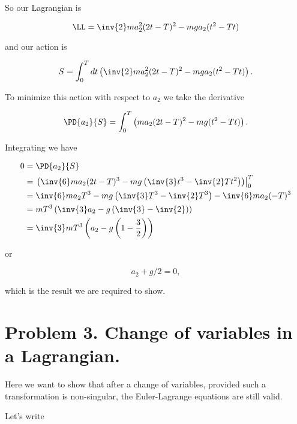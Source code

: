 So our Lagrangian is 

\begin{equation}\label{eqn:classicalMechanicsPs1:240}
\LL = 
\inv{2} m a_2^2 (2 t - T )^2 - m g a_2 (t^2 - T t)
\end{equation}

and our action is

\begin{equation}\label{eqn:classicalMechanicsPs1:260}
S = \int_0^T dt 
\left( 
\inv{2} m a_2^2 (2 t - T )^2 - m g a_2 (t^2 - T t)
\right).
\end{equation}

To minimize this action with respect to $a_2$ we take the derivative

\begin{equation}\label{eqn:classicalMechanicsPs1:280}
\PD{a_2}{S} = \int_0^T
\left( 
m a_2 (2 t - T )^2 - m g (t^2 - T t)
\right).
\end{equation}

Integrating we have

\begin{align*}
0 &= \PD{a_2}{S} \\
&={\left.
\left(
\inv{6} m a_2 (2 t - T )^3 - m g \left(\inv{3}t^3 - \inv{2}T t^2 \right)
\right)\right\vert}_0^T \\
&=
\inv{6} m a_2 T^3 - m g \left(\inv{3}T^3 - \inv{2}T^3 \right)
-
\inv{6} m a_2 (- T )^3 \\
&=
m T^3 \left( \inv{3} a_2 - g \left( \inv{3} - \inv{2} \right) \right) \\
&=
\inv{3} m T^3 \left( a_2 - g \left( 1 - \frac{3}{2} \right) \right) \\
\end{align*}

or

\begin{equation}\label{eqn:classicalMechanicsPs1:300}
a_2 + g/2 = 0,
\end{equation}

which is the result we are required to show.

\section{Problem 3.  Change of variables in a Lagrangian.}

Here we want to show that after a change of variables, provided such a transformation is non-singular, the Euler-Lagrange equations are still valid.

Let's write

